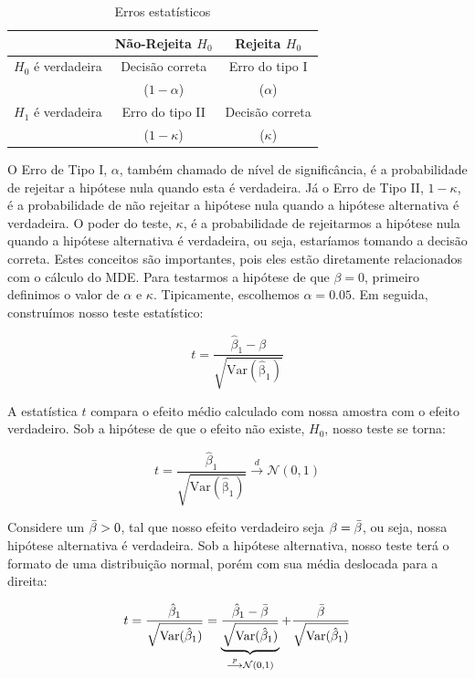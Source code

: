 \begin{table}[h]
    \centering
    \begin{tabular}{l|cc}
         & Não-Rejeita $H_0$ & Rejeita $H_0$ \\\hline
     $H_0$ é verdadeira &  Decisão correta & Erro do tipo I\\
     & ($1-\alpha$)& ($\alpha$)\\
     $H_1$ é verdadeira & Erro do tipo II & Decisão correta \\
     & ($1-\kappa$)& ($\kappa$)\\\hline
    \end{tabular}
    \caption{Erros estatísticos}
    \label{tab:errors}
\end{table}

O Erro de Tipo I, $\alpha$, também chamado de nível de significância, é a probabilidade de rejeitar a hipótese nula quando esta é verdadeira. Já o Erro de Tipo II, $1 - \kappa$, é a probabilidade de não rejeitar a hipótese nula quando a hipótese alternativa é verdadeira. O poder do teste, $\kappa$, é a probabilidade de rejeitarmos a hipótese nula quando a hipótese alternativa é verdadeira, ou seja, estaríamos tomando a decisão correta. Estes conceitos são importantes, pois eles estão diretamente relacionados com o cálculo do MDE. Para testarmos a hipótese de que $\beta = 0$, primeiro definimos o valor de $\alpha$ e $\kappa$. Tipicamente, escolhemos $\alpha = 0.05$. Em seguida, construímos nosso teste estatístico:

    $$
    t = \frac{\hat{\beta}_1 - \beta}{\sqrt{\mathrm{Var(\hat{\beta}_1)}}}
    $$


A estatística $t$ compara o efeito médio calculado com nossa amostra com o efeito verdadeiro. Sob a hipótese de que o efeito não existe, $H_0$, nosso teste se torna:

    \begin{equation}
        t = \frac{\hat{\beta}_1}{\sqrt{\mathrm{Var(\hat{\beta}_1)}}} \stackrel{d}{\longrightarrow} \mathcal{N}(0,1)
    \end{equation}

    Considere um $\Bar{\beta} > 0$, tal que nosso efeito verdadeiro seja $\beta = \Bar{\beta}$, ou seja, nossa hipótese alternativa é verdadeira. Sob a hipótese alternativa, nosso teste terá o formato de uma distribuição normal, porém com sua média deslocada para a direita:

    \begin{equation}
        t = \frac{\hat{\beta}_1}{\sqrt{\mathrm{Var(\hat{\beta}_1)}}} = \underbrace{\frac{\hat{\beta}_1 - \Bar{\beta}}{\sqrt{\mathrm{Var(\hat{\beta}_1)}}}}_{\stackrel{p}{\longrightarrow}\mathcal{N}(0,1)} + \frac{\Bar{\beta}}{\sqrt{\mathrm{Var(\hat{\beta}_1)}}} 
    \end{equation}


